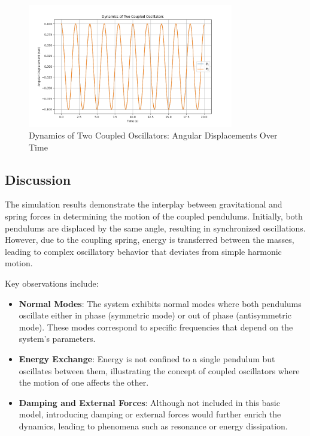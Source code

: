 \documentclass[12pt]{report} %
\begin{document}
    \begin{figure}[h]
        \centering
        \includegraphics[width=0.8\textwidth]{coupled_oscillators.png}
        \caption{Dynamics of Two Coupled Oscillators: Angular Displacements Over Time}
        \label{fig:coupled_oscillators}
    \end{figure}
    
    \subsection{Discussion}
    \label{subsec:part1_task1_discussion}
    
    The simulation results demonstrate the interplay between gravitational and spring forces in determining the motion of the coupled pendulums. Initially, both pendulums are displaced by the same angle, resulting in synchronized oscillations. However, due to the coupling spring, energy is transferred between the masses, leading to complex oscillatory behavior that deviates from simple harmonic motion.
    
    Key observations include:
    
    \begin{itemize}
        \item \textbf{Normal Modes}: The system exhibits normal modes where both pendulums oscillate either in phase (symmetric mode) or out of phase (antisymmetric mode). These modes correspond to specific frequencies that depend on the system's parameters.
        \item \textbf{Energy Exchange}: Energy is not confined to a single pendulum but oscillates between them, illustrating the concept of coupled oscillators where the motion of one affects the other.
        \item \textbf{Damping and External Forces}: Although not included in this basic model, introducing damping or external forces would further enrich the dynamics, leading to phenomena such as resonance or energy dissipation.
    \end{itemize}
    
\end{document}
